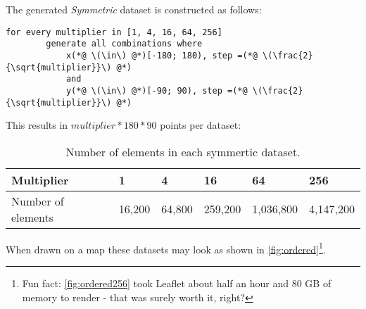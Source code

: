 The generated \textit{Symmetric} dataset is constructed as follows:

\begin{lstlisting}[label=lst:orderedgen,caption={[Generation of the coordinates  for the symmetric dataset.]Generation of the coordinates  for the symmetric dataset.}]
    for every multiplier in [1, 4, 16, 64, 256]
        generate all combinations where
            x(*@ \(\in\) @*)[-180; 180), step =(*@ \(\frac{2}{\sqrt{multiplier}}\) @*)
            and
            y(*@ \(\in\) @*)[-90; 90), step =(*@ \(\frac{2}{\sqrt{multiplier}}\) @*)
\end{lstlisting}

This results in \(multiplier*180*90\) points per dataset:

\begin{table}[H]
    \begin{tabular}{l|l|l|l|l|l}
        Multiplier         & 1      & 4      & 16      & 64        & 256       \\ \hline
        Number of elements & 16,200 & 64,800 & 259,200 & 1,036,800 & 4,147,200
    \end{tabular}
    \caption[Number of elements in each symmertic dataset.]{Number of elements in each symmertic dataset.}
    \label{tab:symcount}
\end{table}

When drawn on a map these datasets may look as shown in \autoref{fig:ordered}\footnote{Fun fact: \autoref{fig:ordered256} took Leaflet about half an hour and 80 GB of memory to render - that was surely worth it, right?}.

